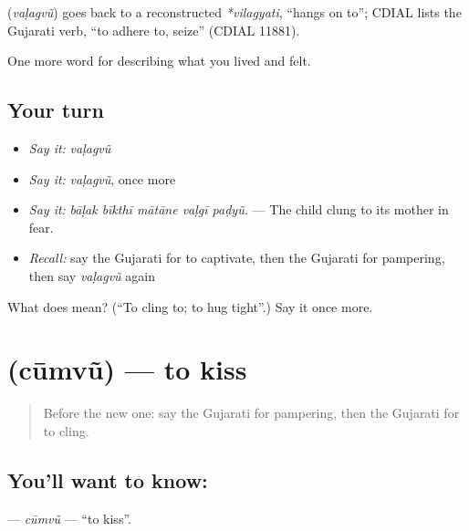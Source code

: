 \begin{cousinweb}
\textbf{} (\emph{vaḷagvũ}) goes back to a reconstructed \emph{*vilagyati}, \textquotedblleft{}hangs on to\textquotedblright{}; CDIAL lists the Gujarati verb, \textquotedblleft{}to adhere to, seize\textquotedblright{} (CDIAL 11881).
\end{cousinweb}

\begin{grammarlens}[title={What you've built}]
One more word for describing what you lived and felt.
\end{grammarlens}

\subsection*{Your turn}
\begin{itemize}
\raggedright
  \item \emph{Say it:} \emph{vaḷagvũ}
  \item \emph{Say it:} \emph{vaḷagvũ}, once more
  \item \emph{Say it:} \emph{bāḷak bīkthī mātāne vaḷgī paḍyũ.} — The child clung to its mother in fear.
  \item \emph{Recall:} say the Gujarati for to captivate, then the Gujarati for pampering, then say \emph{vaḷagvũ} again
\end{itemize}

\begin{tcolorbox}[breakable,colback=teal!4,colframe=teal!35!black,title={Before you move on}]
What does  mean? (\textquotedblleft{}To cling to; to hug tight\textquotedblright{}.) Say it once more.
\end{tcolorbox}
\section[\texorpdfstring{\gu{ચૂમવું} (cūmvũ)}{ચૂમવું (cūmvũ)}]{ (cūmvũ) — to kiss}

\label{lesson:GU-C451-cumvu}



\begin{quote}
Before the new one: say the Gujarati for pampering, then the Gujarati for to cling.
\end{quote}

\subsection*{You'll want to know: }
\textbf{} — \emph{cūmvũ} — \textquotedblleft{}to kiss\textquotedblright{}.

